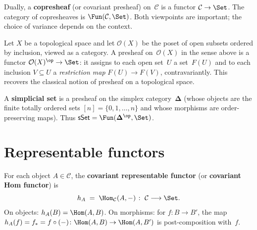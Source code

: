\begin{remark}\label{rem:presheaf-covariant}
Dually, a \textbf{copresheaf} (or covariant presheaf) on~$\mathcal{C}$
is a functor $\mathcal{C}\to\Set$.  The category of copresheaves is
$\Fun(\mathcal{C},\Set)$.  Both viewpoints are important; the choice of
variance depends on the context.
\end{remark}

\begin{example}\label{ex:presheaf-topology}
Let $X$ be a topological space and let $\mathcal{O}(X)$ be the poset of
open subsets ordered by inclusion, viewed as a category.
A presheaf on~$\mathcal{O}(X)$ in the sense above is a functor
$\mathcal{O}(X)^{\op}\to\Set$: it assigns to each open set~$U$ a
set~$F(U)$ and to each inclusion $V\subseteq U$ a \emph{restriction map}
$F(U)\to F(V)$, contravariantly.  This recovers the classical notion of
presheaf on a topological space.
\end{example}

\begin{example}\label{ex:presheaf-simplicial}
\index{$\mathbf{\Delta}$}
A \textbf{simplicial set} is a presheaf on the simplex category~$\mathbf{\Delta}$
(whose objects are the finite totally ordered sets $[n]=\{0,1,\ldots,n\}$
and whose morphisms are order-preserving maps).  Thus
$\mathsf{sSet} = \Fun(\mathbf{\Delta}^{\op},\Set)$.
\end{example}


\section{Representable functors}\label{sec:representable}

\begin{definition}\label{def:h-lower}
For each object $A\in\mathcal{C}$, the \textbf{covariant representable
functor} (or \textbf{covariant Hom functor}) is
\[
    h_A \;=\; \Hom_{\mathcal{C}}(A,-) \;\colon\;
    \mathcal{C} \longrightarrow \Set.
\]
On objects: $h_A(B) = \Hom(A,B)$.
On morphisms: for $f\colon B\to B'$, the map
$h_A(f) = f_* = f\circ(-)\colon \Hom(A,B)\to\Hom(A,B')$
is post-composition with~$f$.
\end{definition}

